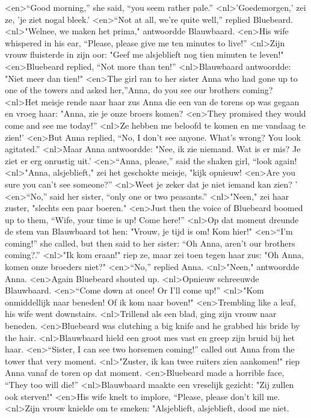 <en>“Good morning,” she said, “you seem rather pale.”
<nl>'Goedemorgen,' zei ze, 'je ziet nogal bleek.'
<en>“Not at all, we’re quite well,” replied Bluebeard.
<nl>"Welnee, we maken het prima," antwoordde Blauwbaard.
<en>His wife whispered in his ear, “Please, please give me ten minutes to live!”
<nl>Zijn vrouw fluisterde in zijn oor: "Geef me alsjeblieft nog  tien minuten te leven!"
<en>Bluebeard replied, “Not more than ten!”
<nl>Blauwbaard antwoordde: "Niet meer dan tien!"
<en>The girl ran to her sister Anna who had gone up to one of the towers and asked her,”Anna, do you see our brothers coming?
<nl>Het meisje rende naar haar zus Anna die  een van de torens op was gegaan en vroeg haar: "Anna, zie je onze broers komen?
<en>They promised they would come and see me today!”
<nl>Ze  hebben  me beloofd te komen en me   vandaag te zien!'
<en>But Anna replied, “No, I don’t see anyone. What’s wrong? You look agitated.” 
<nl>Maar Anna antwoordde: "Nee, ik zie niemand. Wat is er mis? Je ziet er erg onrustig uit.'
<en>“Anna, please,” said the shaken girl, “look again!
<nl>"Anna, alsjeblieft," zei het geschokte meisje, "kijk opnieuw!
<en>Are you sure you can’t see someone?”
<nl>Weet je zeker dat je niet iemand kan zien? '
<en>“No,” said her sister, “only one or two peasants.”
<nl>"Neen," zei haar zuster, "slechts een paar boeren."
<en>Just then the voice of Bluebeard boomed up to them, “Wife, your time is up! Come here!”
<nl>Op dat moment dreunde de stem van Blauwbaard tot hen: "Vrouw, je tijd is om! Kom hier!"
<en>“I’m coming!” she called, but then said to her sister: “Oh Anna, aren’t our brothers coming?.”
<nl>"Ik kom eraan!" riep ze, maar zei toen tegen haar zus: "Oh Anna, komen onze broeders niet?"
<en>“No,” replied Anna.
<nl>"Neen," antwoordde Anna.
<en>Again Bluebeard shouted up.
<nl>Opnieuw schreeuwde Blauwbaard.
<en>“Come down at once! Or I’ll come up!” 
<nl>"Kom onmiddellijk naar beneden! Of ik kom naar boven!"
<en>Trembling like a leaf, his wife went downstairs.
<nl>Trillend als een blad, ging zijn vrouw naar beneden.
<en>Bluebeard was clutching a big knife and he grabbed his bride by the hair.
<nl>Blauwbaard hield een groot mes vast en greep zijn bruid bij het haar.
<en>“Sister, I can see two horsemen coming!” called out Anna from the tower that very moment.
<nl>"Zuster, ik kan twee ruiters zien aankomen!" riep Anna  vanaf de toren op dat moment.
<en>Bluebeard made a horrible face, “They too will die!”
<nl>Blauwbaard maakte een vreselijk gezicht: "Zij zullen ook sterven!"
<en>His wife knelt to implore, “Please, please don’t kill me.
<nl>Zijn vrouw knielde om te smeken: "Alsjeblieft, alsjeblieft, dood me niet.
